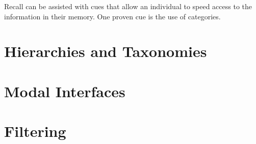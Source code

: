 Recall can be assisted with cues that allow an individual to speed access to the information in their memory. One proven cue is the use of categories.

\section{Hierarchies and Taxonomies}
\begin{comment}
Magic number seven, George Miller
The Structure of the Information Visualization Design Space, Section 2
enclosure
\end{comment}

\section{Modal Interfaces}

\section{Filtering}
\begin{comment}
The Structure of the Information Visualization Design Space, Section 5
dynamic queries technique 

Visual Information Seeking: Tight Coupling of Dynamic Query Filters with Starfield Displays
\end{comment}
